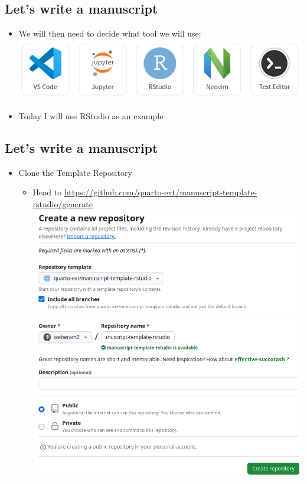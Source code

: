 \documentclass[
  letterpaper,
  DIV=11,
  numbers=noendperiod]{scrartcl}
\providecommand{\tightlist}{%
  \setlength{\itemsep}{0pt}\setlength{\parskip}{0pt}}\usepackage{longtable,booktabs,array}
\begin{document}
\subsection{Let's write a manuscript}\label{lets-write-a-manuscript-1}

\begin{itemize}
\item
  We will then need to decide what tool we will use:
  \includegraphics{img/editors.png}
\item
  Today I will use RStudio as an example
\end{itemize}

\subsection{Let's write a manuscript}\label{lets-write-a-manuscript-2}

\begin{itemize}
\tightlist
\item
  Clone the Template Repository

  \begin{itemize}
  \tightlist
  \item
    Head to
    \url{https://github.com/quarto-ext/manuscript-template-rstudio/generate}
    \includegraphics{img/github_repo.png}
  \end{itemize}
\end{itemize}
\end{document}
